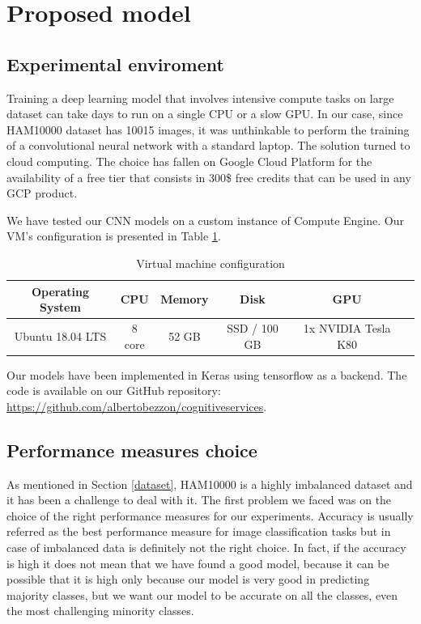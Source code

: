 \section{Proposed model} \label{proposed_model}

	\subsection{Experimental enviroment}
	
	Training a deep learning model that involves intensive compute tasks on large dataset can take days to run on a single CPU or a slow GPU. In our case, since HAM10000 dataset has 10015 images, it was unthinkable to perform the training of a convolutional neural network with a standard laptop. The solution turned to cloud computing. The choice has fallen on Google Cloud Platform for the availability of a free tier that consists in 300\$ free credits that can be used in any GCP product. 
	
	\smallskip
	
	We have tested our CNN models on a custom instance of Compute Engine. Our VM's configuration is presented in Table \ref{tab:hw-config}.
	
	\begin{table}[H]
		\centering
		\begin{tabular}{ |c|c|c|c|c|c| }
			\hline
			\textbf{Operating System} & \textbf{CPU} & \textbf{Memory} & \textbf{Disk} & \textbf{GPU} \\ \hline
			
			Ubuntu 18.04 LTS & 8 core & 52 GB & SSD / 100 GB & 1x NVIDIA Tesla K80 \\ \hline
			
		\end{tabular}
		\caption{Virtual machine configuration}
		\label{tab:hw-config}
	\end{table}
	
	Our models have been implemented in Keras using tensorflow as a backend. The code is available on our GitHub repository: \url{https://github.com/albertobezzon/cognitiveservices}.

	\subsection{Performance measures choice}
		
		As mentioned in Section \ref{dataset}, HAM10000 is a highly imbalanced dataset and it has been a challenge to deal with it. The first problem we faced was on the choice of the right performance measures for our experiments. Accuracy is usually referred as the best performance measure for image classification tasks but in case of imbalanced data is definitely not the right choice. In fact, if the accuracy is high it does not mean that we have found a good model, because it can be possible that it is high only because our model is very good in predicting majority classes, but we want our model to be accurate on all the classes, even the most challenging minority classes.
		
